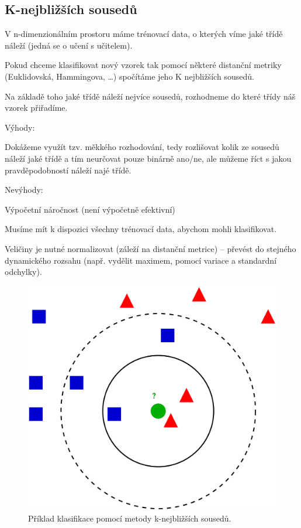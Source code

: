 \subsection{K-nejbližších sousedů}

\begin{compactitem}
    \item V n-dimenzionálním prostoru máme trénovací data, o kterých víme jaké třídě náleží (jedná se o učení s učitelem).

    \item Pokud chceme klasifikovat nový vzorek tak pomocí některé distanční metriky (Euklidovská, Hammingova, \dots) spočítáme jeho K nejbližších sousedů.

    \item Na základě toho jaké třídě náleží nejvíce sousedů, rozhodneme do které třídy náš vzorek přiřadíme.

    \item Výhody: \begin{compactitem}
        \item Dokážeme využít tzv. měkkého rozhodování, tedy rozlišovat kolik ze sousedů náleží jaké třídě a tím neurčovat pouze binárně ano/ne, ale můžeme říct s jakou pravděpodobností náleží najé třídě.

    \end{compactitem}
    \item Nevýhody: \begin{compactitem}
        \item Výpočetní náročnost (není výpočetně efektivní)
        \item Musíme mít k dispozici všechny trénovací data, abychom mohli klasifikovat.
        \item Veličiny je nutné normalizovat (záleží na distanční metrice) -- převést do stejného dynamického rozsahu (např. vydělit maximem, pomocí variace a standardní odchylky).
    \end{compactitem}
\end{compactitem}

\begin{figure}[H]
    \centering
    \includegraphics[width=0.5\linewidth]{knn_classification.png}
    \caption{Příklad klasifikace pomocí metody k-nejbližších sousedů.}
\end{figure}

